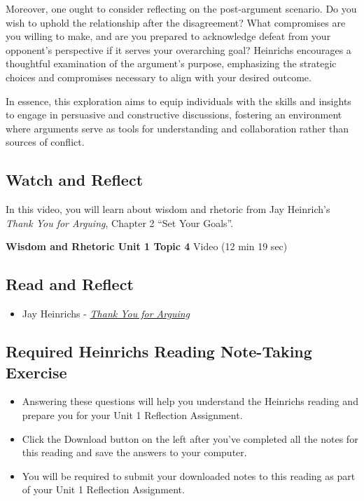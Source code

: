 \documentclass[
]{book}
\providecommand{\tightlist}{%
  \setlength{\itemsep}{0pt}\setlength{\parskip}{0pt}}
\begin{document}
Moreover, one ought to consider reflecting on the post-argument scenario. Do you wish to uphold the relationship after the disagreement? What compromises are you willing to make, and are you prepared to acknowledge defeat from your opponent's perspective if it serves your overarching goal? Heinrichs encourages a thoughtful examination of the argument's purpose, emphasizing the strategic choices and compromises necessary to align with your desired outcome.

In essence, this exploration aims to equip individuals with the skills and insights to engage in persuasive and constructive discussions, fostering an environment where arguments serve as tools for understanding and collaboration rather than sources of conflict.

\hypertarget{watch-and-reflect-6}{%
\subsection*{Watch and Reflect}\label{watch-and-reflect-6}}

In this video, you will learn about wisdom and rhetoric from Jay Heinrich's \emph{Thank You for Arguing}, Chapter 2 ``Set Your Goals''.

\textbf{Wisdom and Rhetoric Unit 1 Topic 4} Video (12 min 19 sec)

\hypertarget{read-and-reflect-3}{%
\subsection*{Read and Reflect}\label{read-and-reflect-3}}

\begin{itemize}
\tightlist
\item
  Jay Heinrichs - \href{assets/u1/PHIL-100-Heinrichs-Thank-You-for-Arguing.pdf}{\emph{Thank You for Arguing}}
\end{itemize}

\hypertarget{required-heinrichs-reading-note-taking-exercise}{%
\subsection*{Required Heinrichs Reading Note-Taking Exercise}\label{required-heinrichs-reading-note-taking-exercise}}

\begin{reflect}
\begin{itemize}
\tightlist
\item
  Answering these questions will help you understand the Heinrichs reading and prepare you for your Unit 1 Reflection Assignment.
\item
  Click the Download button on the left after you've completed all the notes for this reading and save the answers to your computer.
\item
  You will be required to submit your downloaded notes to this reading as part of your Unit 1 Reflection Assignment.
\end{itemize}
\end{reflect}
\end{document}
